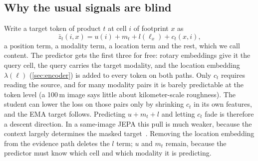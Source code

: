\subsection{Why the usual signals are blind}
\label{sec:blind}

Write a target token of product $t$ at cell $i$ of footprint $x$ as
\begin{equation}
  \bar z_t(i, x) = u(i) + m_t + l(\ell_x) + c_t(x, i),
  \label{eq:decomp}
\end{equation}
a position term, a modality term, a location term and the rest, which we call content. The predictor gets the first three for free: rotary embeddings give it the query cell, the query carries the target modality, and the location embedding $\lambda(\ell)$ (\cref{sec:encoder}) is added to every token on both paths. Only $c_t$ requires reading the source, and for many modality pairs it is barely predictable at the token level (a 100\,m image says little about kilometer-scale roughness). The student can lower the loss on those pairs only by shrinking $c_t$ in its own features, and the EMA target follows. Predicting $u{+}m_t{+}l$ and letting $c_t$ fade is therefore a descent direction. In a same-image JEPA this pull is much weaker, because the context largely determines the masked target~\cite{assran2023self,bardes2024revisiting}. Removing the location embedding from the evidence path deletes the $l$ term; $u$ and $m_t$ remain, because the predictor must know which cell and which modality it is predicting.

